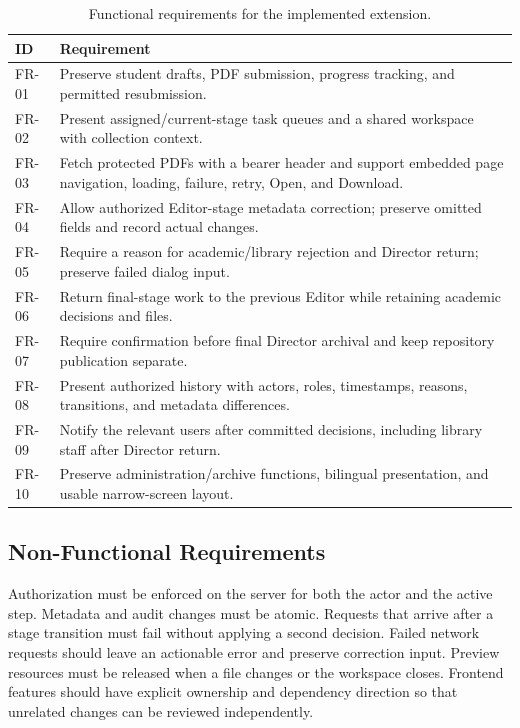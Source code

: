 \documentclass[11pt,a4paper]{report}
\begin{document}
\begin{table}[htbp]
\centering\small
\begin{tabularx}{\textwidth}{@{}l Y@{}}
\toprule
\textbf{ID} & \textbf{Requirement} \\
\midrule
FR-01 & Preserve student drafts, PDF submission, progress tracking, and permitted resubmission. \\
FR-02 & Present assigned/current-stage task queues and a shared workspace with collection context. \\
FR-03 & Fetch protected PDFs with a bearer header and support embedded page navigation, loading, failure, retry, Open, and Download. \\
FR-04 & Allow authorized Editor-stage metadata correction; preserve omitted fields and record actual changes. \\
FR-05 & Require a reason for academic/library rejection and Director return; preserve failed dialog input. \\
FR-06 & Return final-stage work to the previous Editor while retaining academic decisions and files. \\
FR-07 & Require confirmation before final Director archival and keep repository publication separate. \\
FR-08 & Present authorized history with actors, roles, timestamps, reasons, transitions, and metadata differences. \\
FR-09 & Notify the relevant users after committed decisions, including library staff after Director return. \\
FR-10 & Preserve administration/archive functions, bilingual presentation, and usable narrow-screen layout. \\
\bottomrule
\end{tabularx}
\caption{Functional requirements for the implemented extension.}
\label{tab:requirements}
\end{table}

\subsection{Non-Functional Requirements}
Authorization must be enforced on the server for both the actor and the active step. Metadata and audit changes must be atomic. Requests that arrive after a stage transition must fail without applying a second decision. Failed network requests should leave an actionable error and preserve correction input. Preview resources must be released when a file changes or the workspace closes. Frontend features should have explicit ownership and dependency direction so that unrelated changes can be reviewed independently.
\end{document}

